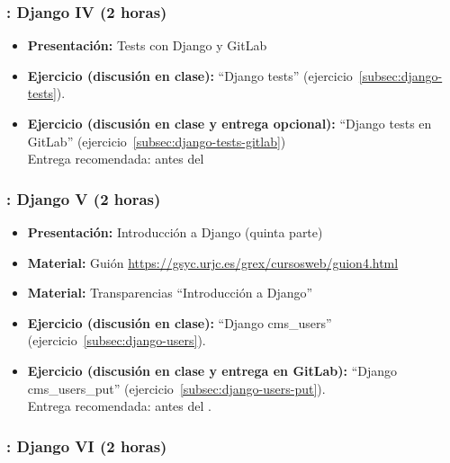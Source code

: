 \documentclass[a4paper,12pt]{article}
\begin{document}
\subsubsection{\juevesJ: Django IV (2 horas)}
\label{cal:juevesJ}

\begin{itemize}
\item \textbf{Presentación:} Tests con Django y GitLab
\item \textbf{Ejercicio (discusión en clase):} ``Django tests'' (ejercicio~\ref{subsec:django-tests}).
\item \textbf{Ejercicio (discusión en clase y entrega opcional):} ``Django tests en GitLab'' (ejercicio~\ref{subsec:django-tests-gitlab}) \\
  Entrega recomendada: antes del \juevesK
\end{itemize}


\subsubsection{\juevesK: Django V (2 horas)}
\label{cal:juevesK}

\begin{itemize}
 \item \textbf{Presentación:} Introducción a Django (quinta parte)
 \item \textbf{Material:} Guión \url{https://gsyc.urjc.es/grex/cursosweb/guion4.html}
 \item \textbf{Material:} Transparencias ``Introducción a Django''
 \item \textbf{Ejercicio (discusión en clase):} ``Django cms\_users'' (ejercicio~\ref{subsec:django-users}).
 \item \textbf{Ejercicio (discusión en clase y entrega en GitLab):} ``Django cms\_users\_put'' (ejercicio~\ref{subsec:django-users-put}). \\
  Entrega recomendada: antes del \juevesL.
\end{itemize}

\subsubsection{\juevesL: Django VI (2 horas)}
\label{cal:juevesL}
\end{document}
